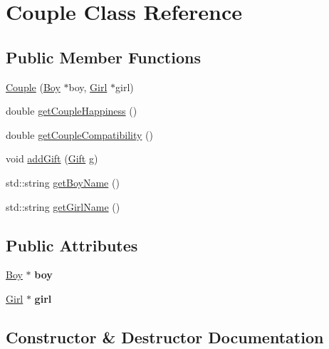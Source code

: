 \hypertarget{class_couple}{}\section{Couple Class Reference}
\label{class_couple}
\subsection*{Public Member Functions}
\begin{DoxyCompactItemize}
\item 
\hyperlink{class_couple_a64c43eadeb35d6647d2753b778a6ee33}{Couple} (\hyperlink{class_boy}{Boy} $\ast$boy, \hyperlink{class_girl}{Girl} $\ast$girl)
\item 
double \hyperlink{class_couple_a8a93de9d5d49ef45761ed98e89628a48}{get\+Couple\+Happiness} ()
\item 
double \hyperlink{class_couple_a9b73843688fdaf6af8bef3c944f0143d}{get\+Couple\+Compatibility} ()
\item 
void \hyperlink{class_couple_a74d14c0dab7fb45bd203e9c55d791883}{add\+Gift} (\hyperlink{class_gift}{Gift} g)
\item 
std\+::string \hyperlink{class_couple_a9e0bcd12b5436edd4546bfb0f3a43e73}{get\+Boy\+Name} ()
\item 
std\+::string \hyperlink{class_couple_a6a90d0e4ce7652962ba9bbf41f7a1392}{get\+Girl\+Name} ()
\end{DoxyCompactItemize}
\subsection*{Public Attributes}
\begin{DoxyCompactItemize}
\item 
\mbox{\label{class_couple_a4038709650b76cf33261a924e881e1a7}} 
\hyperlink{class_boy}{Boy} $\ast$ {\bfseries boy}
\item 
\mbox{\label{class_couple_a80404083a0344425b4bbd94a90d17c39}} 
\hyperlink{class_girl}{Girl} $\ast$ {\bfseries girl}
\end{DoxyCompactItemize}


\subsection{Constructor \& Destructor Documentation}
\mbox{\label{class_couple_a64c43eadeb35d6647d2753b778a6ee33}} 
